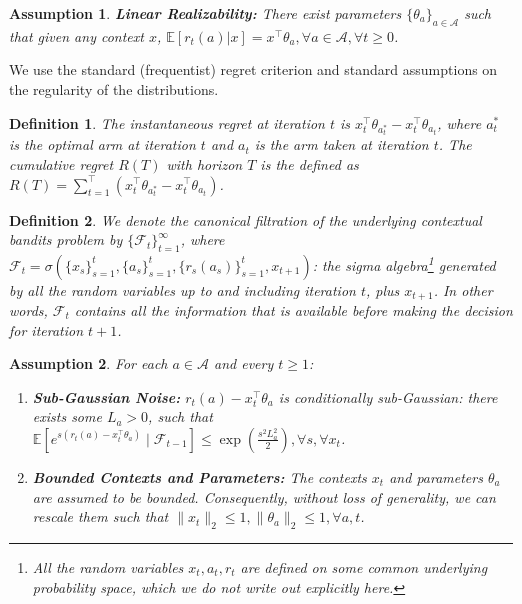 \documentclass[letterpaper]{article} %
\newtheorem{assumption}{Assumption}
\newtheorem{definition}{Definition}
\def\A{\mathcal{A}}
\begin{document}
\begin{assumption}\label{assump:realizability}
\textbf{Linear Realizability:}
There exist parameters $\{\theta_a\}_{a\in \A}$ such that given any context $x$, $\mathbb{E}[r_t(a) | x] = x^\top \theta_a, \forall a \in \A, \forall t \ge 0$.
\end{assumption}

We use the standard (frequentist) regret criterion and standard assumptions on the regularity of the distributions.
\begin{definition}
The instantaneous regret at iteration $t$ is $x^\top_t \theta_{a_t^*} -  x^\top_t \theta_{a_t}$, 
where $a^*_t$ is the optimal arm at iteration $t$ and $a_t$ is the arm taken at iteration $t$.
The cumulative regret $R(T)$ with horizon $T$ is the defined as $R(T) = \sum_{t=1}^\top \left(x^\top_t \theta_{a_t^*} -  x^\top_t \theta_{a_t}\right)$.
\end{definition}

\begin{definition}
We denote the canonical filtration of the underlying contextual bandits problem by $\{\mathcal{F}_t\}_{t=1}^{\infty}$, where $\mathcal{F}_t = \sigma(\{x_s\}_{s=1}^t, \{a_s\}_{s=1}^t, \{r_s(a_s)\}_{s=1}^t, x_{t+1})$: the sigma algebra\footnote{All the random variables $x_t, a_t, r_t$ are defined on some common underlying probability space, which we do not write out explicitly here.} generated by all the random variables up to and including iteration $t$, plus $x_{t+1}$. In other words, $\mathcal{F}_t$ contains all the information that is available before making the decision for iteration $t+1$. 
\end{definition}

\begin{assumption}\label{assump:reg}
For each $a \in \A$ and every $t \ge 1$:
\begin{enumerate}
\item 
\textbf{Sub-Gaussian Noise:}
$r_t(a) - x_t^\top\theta_a$ is conditionally sub-Gaussian:
there exists some $L_a > 0$, such that
$\mathbb{E} [e^{s(r_t(a) - x_t^\top\theta_a)} \mid \mathcal{F}_{t-1}] \le \exp(\frac{s^2 L_a^2}{2}), \forall s, \forall x_t$.
\item
\textbf{Bounded Contexts and Parameters:}
The contexts $x_t$ and parameters $\theta_a$ are assumed to be bounded.
Consequently, without loss of generality, we can rescale them such that
$\|x_t\|_2 \le 1, \|\theta_a\|_2 \le 1, \forall a, t$.
\end{enumerate}

\end{assumption}
\end{document}
